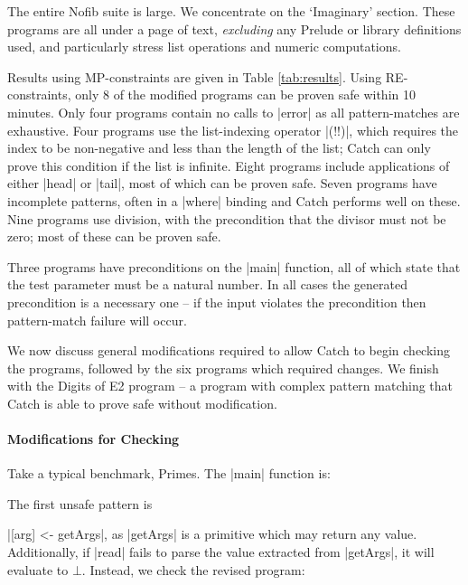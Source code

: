 \documentclass[preprint]{sigplanconf}
\begin{document}
The entire Nofib suite \cite{nofib} is large. We concentrate on the `Imaginary' section. These programs are all under a page of text, \textit{excluding} any Prelude or library definitions used, and particularly stress list operations and numeric computations.

Results using MP-constraints are given in Table \ref{tab:results}. Using RE-constraints, only 8 of the modified programs can be proven safe within 10 minutes. Only four programs contain no calls to |error| as all pattern-matches are exhaustive. Four programs use the list-indexing operator |(!!)|, which requires the index to be non-negative and less than the length of the list; Catch can only prove this condition if the list is infinite. Eight programs include applications of either |head| or |tail|, most of which can be proven safe. Seven programs have incomplete patterns, often in a |where| binding and Catch performs well on these. Nine programs use division, with the precondition that the divisor must not be zero; most of these can be proven safe.

Three programs have preconditions on the |main| function, all of which state that the test parameter must be a natural number. In all cases the generated precondition is a necessary one -- if the input violates the precondition then pattern-match failure will occur.

We now discuss general modifications required to allow Catch to begin checking the programs, followed by the six programs which required changes. We finish with the Digits of E2 program -- a program with complex pattern matching that Catch is able to prove safe without modification.

\paragraph{Modifications for Checking}

Take a typical benchmark, Primes. The |main| function is:

\begin{comment}
\begin{code}
primes :: [Int]
\end{code}
\end{comment}


The first unsafe pattern is \ignore|[arg] <- getArgs|, as |getArgs| is a primitive which may return any value. Additionally, if |read| fails to parse the value extracted from |getArgs|, it will evaluate to $\bot{}$. Instead, we check the revised program:
\end{document}
